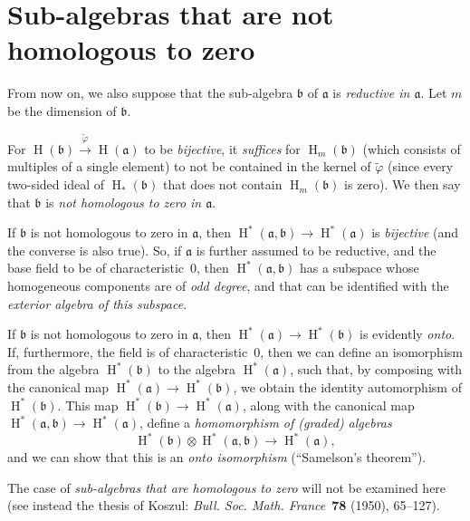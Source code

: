 \documentclass{article}
\newcommand{\fk}{\mathfrak}
\DeclareMathOperator{\HH}{H}
\begin{document}
\section{Sub-algebras that are not homologous to zero}
\label{III.4}

From now on, we also suppose that the sub-algebra $\fk{b}$ of $\fk{a}$ is \emph{reductive in $\fk{a}$}.
Let $m$ be the dimension of $\fk{b}$.

For $\HH(\fk{b})\xrightarrow{\widetilde{\varphi}}\HH(\fk{a})$ to be \emph{bijective}, it \emph{suffices} for $\HH_m(\fk{b})$ (which consists of multiples of a single element) to not be contained in the kernel of $\widetilde{\varphi}$ (since every two-sided ideal of $\HH_*(\fk{b})$ that does not contain $\HH_m(\fk{b})$ is zero).
We then say that $\fk{b}$ is \emph{not homologous to zero in $\fk{a}$}.

If $\fk{b}$ is not homologous to zero in $\fk{a}$, then $\HH^*(\fk{a},\fk{b})\to\HH^*(\fk{a})$ is \emph{bijective} (and the converse is also true).
So, if $\fk{a}$ is further assumed to be reductive, and the base field to be of characteristic~$0$, then $\HH^*(\fk{a},\fk{b})$ has a subspace whose homogeneous components are of \emph{odd degree}, and that can be identified with the \emph{exterior algebra of this subspace}.

If $\fk{b}$ is not homologous to zero in $\fk{a}$, then $\HH^*(\fk{a})\to\HH^*(\fk{b})$ is evidently \emph{onto}.
If, furthermore, the field is of characteristic~$0$, then we can define an isomorphism from the algebra $\HH^*(\fk{b})$ to the algebra $\HH^*(\fk{a})$, such that, by composing with the canonical map $\HH^*(\fk{a})\to\HH^*(\fk{b})$, we obtain the identity automorphism of $\HH^*(\fk{b})$.
This map $\HH^*(\fk{b})\to\HH^*(\fk{a})$, along with the canonical map $\HH^*(\fk{a},\fk{b})\to\HH^*(\fk{a})$, define a \emph{homomorphism of (graded) algebras}
\[
  \HH^*(\fk{b})\otimes\HH^*(\fk{a},\fk{b}) \to \HH^*(\fk{a}),
\]
and we can show that this is an \emph{onto isomorphism} (``Samelson's theorem'').

The case of \emph{sub-algebras that are homologous to zero} will not be examined here (see instead the thesis of Koszul: \emph{Bull. Soc. Math. France}~\textbf{78} (1950), 65--127).
\end{document}
